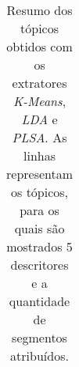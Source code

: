 \begin{table}[!h]
\begin{tabular}{|l|c||l|c||l|c|}

	\end{tabular}
	\caption{Resumo dos tópicos obtidos com os extratores \textit{K-Means}, \textit{LDA} e \textit{PLSA}. 
As linhas representam os tópicos, para os quais são mostrados 5 descritores e a quantidade de segmentos atribuídos.
}
	\label{tab:resumo-resultados}
\end{table}



